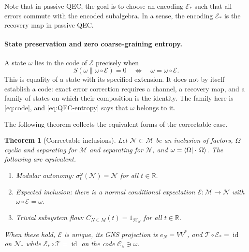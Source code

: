 \documentclass[a4paper,11pt]{article}
\newtheorem{theorem}{Theorem}
\theoremstyle{definition}
\newcommand{\mE}{\mathcal{E}}
\begin{document}
Note that in passive QEC, the goal is to choose an encoding $\mE_*$ such that all errors commute with the encoded subalgebra. In a sense, the encoding $\mE_*$ is the recovery map in passive QEC.

\paragraph{State preservation and zero coarse-graining entropy.}
A state $\omega$ lies in the code of $\mE$ precisely when
\begin{equation}
 S(\omega\|\omega\circ\mE)=0\quad\Longleftrightarrow\quad\omega=\omega\circ\mE .
 \label{eq:QEC-entropy}
\end{equation}
This is equality of a state with its specified extension. It does not by itself establish a code: exact error correction requires a channel, a recovery map, and a family of states on which their composition is the identity. The family here is \eqref{eq:code}, and \eqref{eq:QEC-entropy} says that $\omega$ belongs to it.

The following theorem collects the equivalent forms of the correctable case. 
\begin{theorem}[Correctable inclusions]\label{thm:correctable}
Let $\mathcal N\subset\mathcal M$ be an inclusion of factors, $\Omega$ cyclic and separating for $\mathcal M$ and separating for $\mathcal N$, and $\omega=\braket{\Omega|\cdot\,\Omega}$. The following are equivalent.
\begin{enumerate}
 \item[\rm(i)] \emph{Modular autonomy:} $\sigma^{\omega}_t(\mathcal N)=\mathcal N$ for all $t\in\mathbb R$.
 \item[\rm(ii)] \emph{Expected inclusion:} there is a normal conditional expectation $\mE:\mathcal M\to\mathcal N$ with $\omega\circ\mE=\omega$.
 \item[\rm(iii)] \emph{Trivial subsystem flow:} $C_{N\subset M}(t)=1_{\mathcal H_N}$ for all $t\in\mathbb R$.
\end{enumerate}
When these hold, $\mE$ is unique, its GNS projection is $e_N=VV^*$, and $\mathcal T\circ\mE_*=\operatorname{id}$ on $\mathcal N_*$ while $\mE_*\circ\mathcal T=\operatorname{id}$ on the code $\mathcal C_{\mE}\ni\omega$.
\end{theorem}
\end{document}
